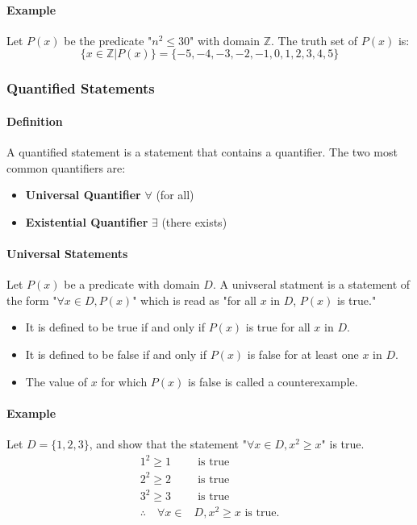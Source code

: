 \paragraph*{Example}
Let $P(x)$ be the predicate "$n^2 \leq 30$" with domain $\mathbb{Z}$. The truth set of $P(x)$ is:
\begin{equation*}
    \{x \in \mathbb{Z} | P(x)\} = \{-5, -4, -3, -2, -1, 0, 1, 2, 3, 4, 5\}
\end{equation*}

\subsubsection*{Quantified Statements}
\paragraph*{Definition}
A quantified statement is a statement that contains a quantifier. The two most common quantifiers are:
\begin{itemize}
    \item \textbf{Universal Quantifier} $\forall$ (for all)
    \item \textbf{Existential Quantifier} $\exists$ (there exists)
\end{itemize}

\paragraph*{Universal Statements}
Let $P(x)$ be a predicate with domain $D$. A univseral statment is a statement of the form 
"$\forall x \in D, P(x)$" which is read as "for all $x$ in $D$, $P(x)$ is true."
\begin{itemize}
    \item It is defined to be true if and only if $P(x)$ is true for all $x$ in $D$.
    \item It is defined to be false if and only if $P(x)$ is false for at least one $x$ in $D$.
    \item The value of $x$ for which $P(x)$ is false is called a counterexample.
\end{itemize}

\paragraph*{Example}
Let $D = \{1,2,3\}$, and show that the statement "$\forall x \in D, x^2 \geq x$" is true.
\begin{align*}
    1^2 \geq 1 &\text{ is true}\\
    2^2 \geq 2 &\text{ is true}\\
    3^2 \geq 3 &\text{ is true}\\
    \therefore \quad \forall x \in &D, x^2 \geq x \text{ is true.}
\end{align*}

